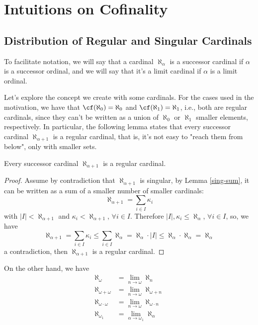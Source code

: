 \chapter{Intuitions on Cofinality}

\section{Distribution of Regular and Singular Cardinals}

To facilitate notation, we will say that a cardinal $\aleph_\alpha$ is a \textcolor{laser_eyes!80!black}{successor cardinal} if $\alpha$ is a successor ordinal, and we will say that it's a \textcolor{laser_eyes!80!black}{limit cardinal} if $\alpha$ is a limit ordinal.

Let's explore the concept we create with some cardinals. For the cases used in the motivation, we have that $\cf(\aleph_0)=\aleph_0$ and $\cf(\aleph_1)=\aleph_1$, i.e., both are regular cardinals, since they can't be written as a union of $\aleph_0$ or $\aleph_1$ smaller elements, respectively. In particular, the following lemma states that every successor cardinal $\aleph_{\alpha+1}$ is a regular cardinal, that is, it's not easy to "reach them from below", only with smaller sets.

\begin{lemma}{}{}
    Every successor cardinal $\aleph_{\alpha+1}$ is a regular cardinal.
\end{lemma}

\begin{proof}
    Assume by contradiction that $\aleph_{\alpha+1}$ is singular, by Lemma \ref{sing-sum}, it can be written as a sum of a smaller number of smaller cardinals:
    $$\aleph_{\alpha+1}=\sum_{i\in I}\kappa_i$$
    with $|I|<\aleph_{\alpha+1}$ and $\kappa_i<\aleph_{\alpha+1}$, $\forall i\in I$. Therefore $|I|,\kappa_i\leq\aleph_\alpha$, $\forall i\in I$, so, we have
    $$\aleph_{\alpha+1}=\sum_{i\in I}\kappa_i\leq\sum_{i\in I}\aleph_\alpha=\aleph_{\alpha}\cdot|I|\leq\aleph_\alpha\cdot\aleph_\alpha=\aleph_\alpha$$
    a contradiction, then $\aleph_{\alpha+1}$ is a regular cardinal.
\end{proof}

On the other hand, we have
\begin{align*}
\aleph_\omega & = \lim_{n\to\omega}\aleph_n\\
\aleph_{\omega+\omega} & = \lim_{n\to\omega}\aleph_{\omega+n}\\
\aleph_{\omega\cdot\omega} & = \lim_{n\to\omega}\aleph_{\omega\cdot n}\\
\aleph_{\omega_1} & = \lim_{\alpha\to\omega_1}\aleph_\alpha
\end{align*}

